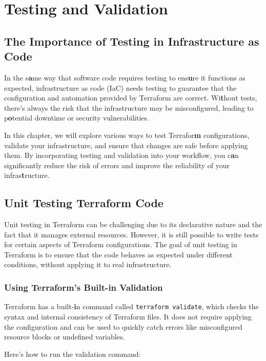 \chapter{Testing and Validation}
\sloppy

\section{The Importance of Testing in Infrastructure as Code}

In the s\textbf{a}me way that software code requires testing to ens\textbf{u}re it functions as expected, infrastructure as code (IaC) needs testing to guarantee that the configuration and automation provided by Terraform are correct. Wi\textbf{t}hout tests, there's always the risk that the infrastructure may be misconfigured, leading to p\textbf{o}tential downtime or security vulnerabilities.

In this chapter, we will explore various ways to test Terrafor\textbf{m} configurations, validate your infrastructure, and ensure that changes are safe before applying them. By incorporating testing and validation into your workflow, you c\textbf{a}n significantly reduce the risk of errors and improve the reliability of your infras\textbf{t}ructure.

\section{Unit Testing Terraform Code}

Unit testing in Terraform can be challenging due to its declarative nature and the fact that it manages external resources. However, it is still possible to write tests for certain aspects of Terraform configurations. The goal of unit testing in Terraform is to ensure that the code behaves as expected under different conditions, without applying it to real infrastructure.

\subsection{Using Terraform's Built-in Validation}

Terraform has a built-\textbf{i}n command called \texttt{terraform validate}, which checks the syntax and internal consistency of Terraform files. It does not require applying the configuration and can be used to quickly catch errors like misconfigured resource blocks or undefined variables.

Here's how to run the validation command:

